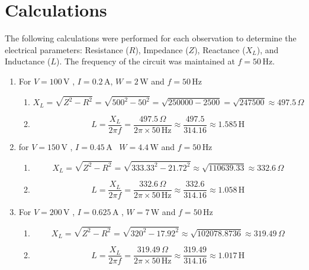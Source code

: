\documentclass[a4paper,12pt]{article}
\begin{document}
\section{Calculations}

The following calculations were performed for each observation to determine the electrical parameters: Resistance (\( R \)), Impedance (\( Z \)), Reactance (\( X_L \)), and Inductance (\( L \)). The frequency of the circuit was maintained at \( f = 50\,\text{Hz} \).

\begin{enumerate}
\item 
	For  \( V = 100\,\text{V} \) , \( I = 0.2\,\text{A} \),   \( W = 2\,\text{W} \) and   \( f = 50\,\text{Hz} \)
	
	
	
	\begin{enumerate}
		
		\item 
		\[
		X_L = \sqrt{Z^{2} - R^{2}} = \sqrt{500^{2} - 50^{2}} = \sqrt{250000 - 2500} = \sqrt{247500} \approx 497.5\,\Omega
		\]
		\item
		\[
		L = \frac{X_L}{2\pi f} = \frac{497.5\,\Omega}{2\pi \times 50\,\text{Hz}} \approx \frac{497.5}{314.16} \approx 1.585\,\text{H}
		\]
		
		
	\end{enumerate}
	
\item 	
	
	for \( V = 150\,\text{V} \)
	, \( I = 0.45\,\text{A} \)
	\, \( W = 4.4\,\text{W} \)
	and \( f = 50\,\text{Hz} \)
	
	
	\begin{enumerate}
		
		\item 
		\[
		X_L = \sqrt{Z^{2} - R^{2}} = \sqrt{333.33^{2} - 21.72^{2}} \approx \sqrt{110639.33} \approx 332.6\,\Omega
		\]
		\item
		\[
		L = \frac{X_L}{2\pi f} = \frac{332.6\,\Omega}{2\pi \times 50\,\text{Hz}} \approx \frac{332.6}{314.16} \approx 1.058\,\text{H}
		\]
		
	\end{enumerate}
	
	
\item 
	
	
	For	\( V = 200\,\text{V} \)
	, \( I = 0.625\,\text{A} \)
	, \( W = 7\,\text{W} \)
	and \( f = 50\,\text{Hz} \)
	
	\begin{enumerate}
		
		\item 
		\[
		X_L = \sqrt{Z^{2} - R^{2}} = \sqrt{320^{2} - 17.92^{2}}  \approx \sqrt{102078.8736} \approx 319.49\,\Omega
		\]
		\item
		\[
		L = \frac{X_L}{2\pi f} = \frac{319.49\,\Omega}{2\pi \times 50\,\text{Hz}} \approx \frac{319.49}{314.16} \approx 1.017\,\text{H}
		\]
		
		
	\end{enumerate}
	
\end{enumerate}
\end{document}
